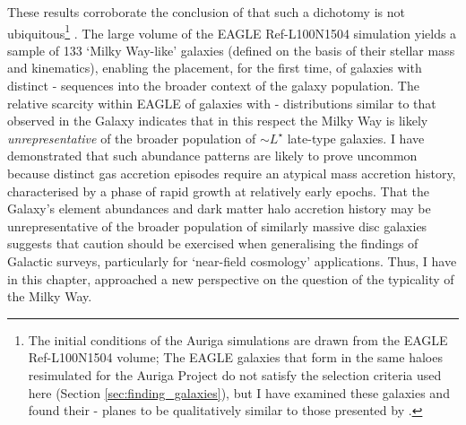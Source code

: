 These results corroborate the conclusion of \citet{2017arXiv170807834G} that such a dichotomy is not ubiquitous\footnote{The initial conditions of the Auriga simulations are drawn from the EAGLE Ref-L100N1504 volume; The EAGLE galaxies that form in the same haloes resimulated for the Auriga Project do not satisfy the selection criteria used here (Section \ref{sec:finding_galaxies}), but I have examined these galaxies and found their \afe{}-\feh{} planes to be qualitatively similar to those presented by \citet{2017arXiv170807834G}.} \citep[c.f also][]{2012MNRAS.426..690B,2014A&A...572A..92M}. The large volume of the EAGLE Ref-L100N1504 simulation yields a sample of 133 `Milky Way-like' galaxies (defined on the basis of their stellar mass and kinematics), enabling the placement, for the first time, of galaxies with distinct \afe{}-\feh{} sequences into the broader context of the galaxy population. The relative scarcity within EAGLE of galaxies with \afe{}-\feh{} distributions similar to that observed in the Galaxy indicates that in this respect the Milky Way is likely \emph{unrepresentative} of the broader population of $\sim L^\star$ late-type galaxies. I have demonstrated that such abundance patterns are likely to prove uncommon because distinct gas accretion episodes require an atypical mass accretion history, characterised by a phase of rapid growth at relatively early epochs. That the Galaxy's element abundances and dark matter halo accretion history may be unrepresentative of the broader population of similarly massive disc galaxies suggests that caution should be exercised when generalising the findings of Galactic surveys, particularly for `near-field cosmology' applications. Thus, I have in this chapter, approached a new perspective on the question of the typicality of the Milky Way. 

